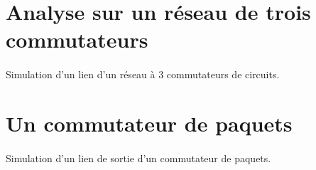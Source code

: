     \section{Analyse sur un réseau de trois commutateurs}
%
        \paragraph{}
Simulation d'un lien d'un réseau à 3 commutateurs de circuits.

    \clearpage
%
    \clearpage
%
%
%
    \section{Un commutateur de paquets}
%
        \paragraph{}
Simulation d'un lien de sortie d'un commutateur de paquets.

    \clearpage
%
    \clearpage
%
    \clearpage
%

